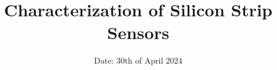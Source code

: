 

\title{Characterization of Silicon Strip Sensors}
\date{%
  Date: 30th of April 2024
}




\maketitle
\thispagestyle{empty}
\tableofcontents
\newpage






\printbibliography{}

% 



